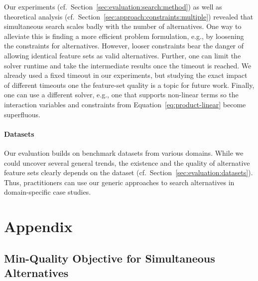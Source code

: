 \documentclass{article}
\theoremstyle{definition}
\begin{document}
Our experiments (cf.~Section~\ref{sec:evaluation:search:method}) as well as theoretical analysis (cf.~Section~\ref{sec:approach:constraints:multiple}) revealed that simultaneous search scales badly with the number of alternatives.
One way to alleviate this is finding a more efficient problem formulation, e.g., by loosening the constraints for alternatives.
However, looser constraints bear the danger of allowing identical feature sets as valid alternatives.
Further, one can limit the solver runtime and take the intermediate results once the timeout is reached.
We already used a fixed timeout in our experiments, but studying the exact impact of different timeouts one the feature-set quality is a topic for future work.
Finally, one can use a different solver, e.g., one that supports non-linear terms so the interaction variables and constraints from Equation~\ref{eq:product-linear} become superfluous.

\paragraph{Datasets}

Our evaluation builds on benchmark datasets from various domains.
While we could uncover several general trends, the existence and the quality of alternative feature sets clearly depends on the dataset (cf.~Section~\ref{sec:evaluation:datasets}).
Thus, practitioners can use our generic approaches to search alternatives in domain-specific case studies.

\appendix

\section{Appendix}
\label{sec:appendix}

\subsection{Min-Quality Objective for Simultaneous Alternatives}
\label{sec:appendix:min-quality-objective}
\end{document}
